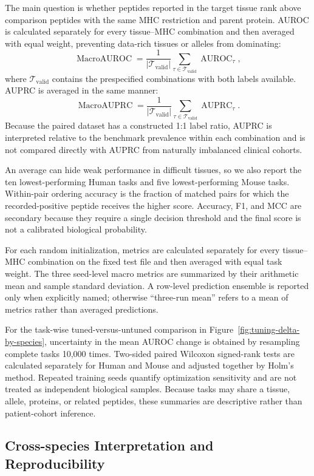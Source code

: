 The main question is whether peptides reported in the target tissue rank above comparison peptides with the same MHC restriction and parent protein. AUROC is calculated separately for every tissue--MHC combination and then averaged with equal weight, preventing data-rich tissues or alleles from dominating:
\[
\operatorname{MacroAUROC}
=
\frac{1}{|\mathcal{T}_{\mathrm{valid}}|}
\sum_{\tau\in\mathcal{T}_{\mathrm{valid}}}
\operatorname{AUROC}_{\tau},
\]
where \(\mathcal{T}_{\mathrm{valid}}\) contains the prespecified combinations with both labels available. AUPRC is averaged in the same manner:
\[
\operatorname{MacroAUPRC}
=
\frac{1}{|\mathcal{T}_{\mathrm{valid}}|}
\sum_{\tau\in\mathcal{T}_{\mathrm{valid}}}
\operatorname{AUPRC}_{\tau}.
\]
Because the paired dataset has a constructed 1:1 label ratio, AUPRC is interpreted relative to the benchmark prevalence within each combination and is not compared directly with AUPRC from naturally imbalanced clinical cohorts.

An average can hide weak performance in difficult tissues, so we also report the ten lowest-performing Human tasks and five lowest-performing Mouse tasks. Within-pair ordering accuracy is the fraction of matched pairs for which the recorded-positive peptide receives the higher score. Accuracy, F1, and MCC are secondary because they require a single decision threshold and the final score is not a calibrated biological probability.

For each random initialization, metrics are calculated separately for every tissue--MHC combination on the fixed test file and then averaged with equal task weight. The three seed-level macro metrics are summarized by their arithmetic mean and sample standard deviation. A row-level prediction ensemble is reported only when explicitly named; otherwise “three-run mean” refers to a mean of metrics rather than averaged predictions.

For the task-wise tuned-versus-untuned comparison in Figure~\ref{fig:tuning-delta-by-species}, uncertainty in the mean AUROC change is obtained by resampling complete tasks 10,000 times. Two-sided paired Wilcoxon signed-rank tests are calculated separately for Human and Mouse and adjusted together by Holm's method. Repeated training seeds quantify optimization sensitivity and are not treated as independent biological samples. Because tasks may share a tissue, allele, proteins, or related peptides, these summaries are descriptive rather than patient-cohort inference.

\subsection{Cross-species Interpretation and Reproducibility}

